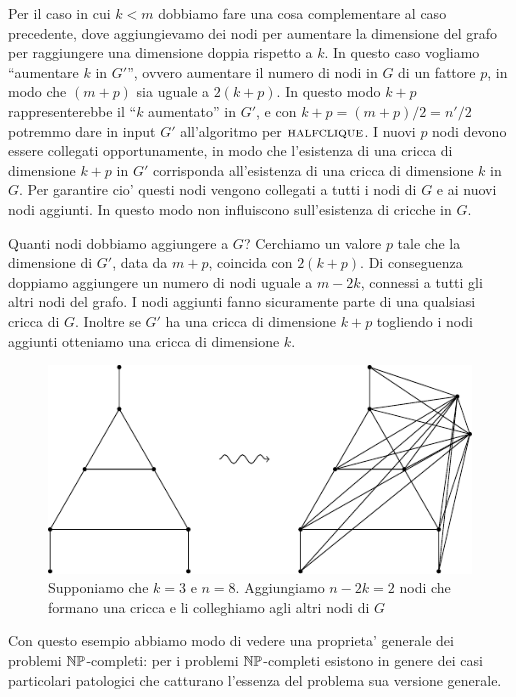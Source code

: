 Per il caso in cui $k < m$ dobbiamo fare una cosa complementare al caso precedente, dove
aggiungievamo dei nodi per aumentare la dimensione del grafo per raggiungere una dimensione doppia
rispetto a $k$. In questo caso vogliamo ``aumentare $k$ in $G'$'', ovvero aumentare il numero di
nodi in $G$ di un fattore $p$, in modo che $(m+p)$ sia uguale a $2(k+p)$. In questo modo $k + p$
rappresenterebbe il ``$k$ aumentato'' in $G'$, e con $k+p = (m+p)/2 = n'/2$ potremmo dare in input
$G'$ all'algoritmo per $\textsc{halfclique}$. I nuovi $p$ nodi devono essere collegati opportunamente, in
modo che l'esistenza di una cricca di dimensione $k+p$ in $G'$ corrisponda all'esistenza di una
cricca di dimensione $k$ in $G$. Per garantire cio' questi nodi vengono collegati a tutti i nodi di
$G$ e ai nuovi nodi aggiunti. In questo modo non influiscono sull'esistenza di cricche in $G$.

Quanti nodi dobbiamo aggiungere a $G$? Cerchiamo un valore $p$ tale che la dimensione di $G'$, data
da $m + p$, coincida con $2(k + p)$. Di conseguenza doppiamo aggiungere un numero di nodi uguale a
$m - 2k$, connessi a tutti gli altri nodi del grafo. I nodi aggiunti fanno sicuramente parte di una
qualsiasi cricca di $G$. Inoltre se $G'$ ha una cricca di dimensione $k+p$ togliendo i nodi aggiunti
otteniamo una cricca di dimensione $k$.

\begin{figure}[h]
    \begin{center}
        \includegraphics{./img/NPClass/CLIHCLI2.pdf}
        \caption{Supponiamo che $k=3$ e $n=8$. Aggiungiamo $n-2k = 2$ nodi che formano una cricca e
            li colleghiamo agli altri nodi di $G$}
    \end{center}
\end{figure}

Con questo esempio abbiamo modo di vedere una proprieta' generale dei problemi $\mathbb{NP}$-completi:
per i problemi $\mathbb{NP}$-completi esistono in genere dei casi particolari patologici che catturano
l'essenza del problema sua versione generale.


